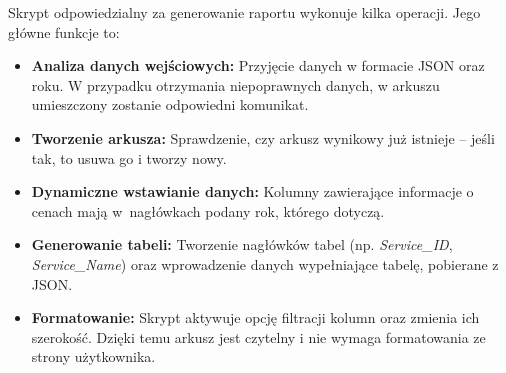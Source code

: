 Skrypt odpowiedzialny za generowanie raportu wykonuje kilka operacji. Jego główne funkcje to:
\begin{itemize}
    \item \textbf{Analiza danych wejściowych:} Przyjęcie danych w formacie JSON oraz roku. W przypadku otrzymania niepoprawnych danych, w arkuszu umieszczony zostanie odpowiedni komunikat.
    \item \textbf{Tworzenie arkusza:} Sprawdzenie, czy arkusz wynikowy już istnieje -- jeśli tak, to usuwa go i tworzy nowy.
    \item \textbf{Dynamiczne wstawianie danych:} Kolumny zawierające informacje o cenach mają w~nagłówkach podany rok, którego dotyczą.
    \item \textbf{Generowanie tabeli:} Tworzenie nagłówków tabel (np. \emph{Service\_ID}, \emph{Service\_Name}) oraz wprowadzenie danych wypełniające tabelę, pobierane z JSON.
    \item \textbf{Formatowanie:} Skrypt aktywuje opcję filtracji kolumn oraz zmienia ich szerokość. Dzięki temu arkusz jest czytelny i nie wymaga formatowania ze strony użytkownika.
\end{itemize}




